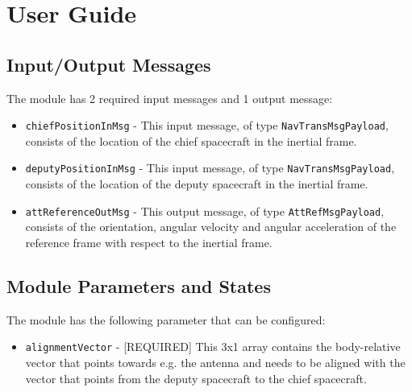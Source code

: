
\section{User Guide}

\subsection{Input/Output Messages}

The module has 2 required input messages and 1 output message:

\begin{itemize}
    \item {\tt chiefPositionInMsg} - This input message, of type {\tt NavTransMsgPayload}, consists of the location of the chief spacecraft in the inertial frame.
    \item {\tt deputyPositionInMsg} - This input message, of type {\tt NavTransMsgPayload}, consists of the location of the deputy spacecraft in the inertial frame.
    \item {\tt attReferenceOutMsg} - This output message, of type {\tt AttRefMsgPayload}, consists of the orientation, angular velocity and angular acceleration of the reference frame with respect to the inertial frame.
\end{itemize}

\subsection{Module Parameters and States}

The module has the following parameter that can be configured:

\begin{itemize}
    \item {\tt alignmentVector} - [REQUIRED] This 3x1 array contains the body-relative vector that points towards e.g. the antenna and needs to be aligned with the vector that points from the deputy spacecraft to the chief spacecraft.
\end{itemize}

